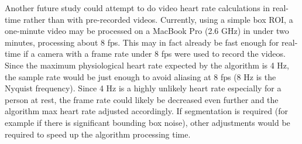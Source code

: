\documentclass[10pt,twocolumn,letterpaper]{article}
\begin{document}
Another future study could attempt to do video heart rate calculations in real-time rather than with pre-recorded videos. Currently, using a simple box ROI, a one-minute video may be processed on a MacBook Pro (2.6 GHz) in under two minutes, processing about 8 fps. This may in fact already be fast enough for real-time if a camera with a frame rate under 8 fps were used to record the videos. Since the maximum physiological heart rate expected by the algorithm is 4 Hz, the sample rate would be just enough to avoid aliasing at 8 fps (8 Hz is the Nyquist frequency). Since 4 Hz is a highly unlikely heart rate especially for a person at rest, the frame rate could likely be decreased even further and the algorithm max heart rate adjusted accordingly. If segmentation is required (for example if there is significant bounding box noise), other adjustments would be required to speed up the algorithm processing time.

\newpage

{\small


}
\end{document}
